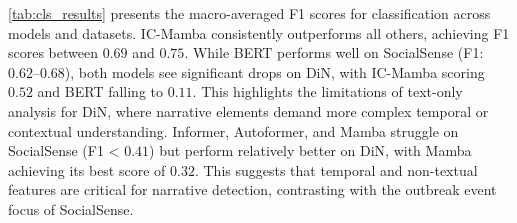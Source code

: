 \cref{tab:cls_results} presents the macro-averaged F1 scores for classification across models and datasets. IC-Mamba consistently outperforms all others, achieving F1 scores between $0.69$ and $0.75$. While BERT performs well on SocialSense (F1: $0.62$–$0.68$), both models see significant drops on DiN, with IC-Mamba scoring $0.52$ and BERT falling to $0.11$. This highlights the limitations of text-only analysis for DiN, where narrative elements demand more complex temporal or contextual understanding.
Informer, Autoformer, and Mamba struggle on SocialSense (F1 < $0.41$) but perform relatively better on DiN, with Mamba achieving its best score of $0.32$. This suggests that temporal and non-textual features are critical for narrative detection, contrasting with the outbreak event focus of SocialSense.

